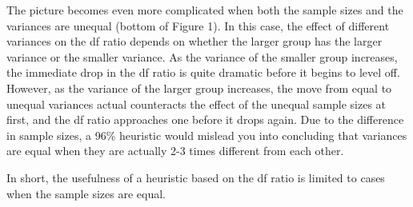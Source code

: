 \documentclass[man,a4paper,noextraspace,apacite]{apa6}
\begin{document}

    The picture becomes even more complicated when both the sample sizes and 
the variances are unequal (bottom of Figure 1). In this case, the effect of 
different variances on the df ratio depends on whether the larger group has the 
larger variance or the smaller variance. As the variance of the smaller group 
increases, the immediate drop in the df ratio is quite dramatic before it 
begins to level off. However, as the variance of the larger group increases, 
the move from equal to unequal variances actual counteracts the effect of the 
unequal sample sizes at first, and the df ratio approaches one before it drops 
again. Due to the difference in sample sizes, a 96\% heuristic would mislead you 
into concluding that variances are equal when they are actually 2-3 times 
different from each other.


In short, the usefulness of a heuristic based on the df ratio is limited to 
cases when the sample sizes are equal. 
\end{document}
